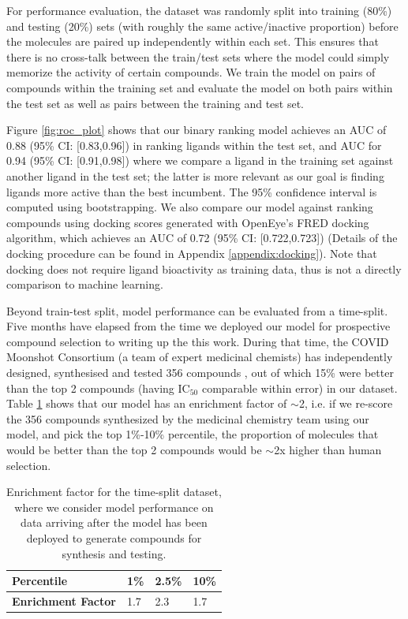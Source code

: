 For performance evaluation, the dataset was randomly split into training (80\%) and testing (20\%) sets (with roughly the same active/inactive proportion) before the molecules are paired up independently within each set. This ensures that there is no cross-talk between the train/test sets where the model could simply memorize the activity of certain compounds. We train the model on pairs of compounds within the training set and evaluate the model on both pairs within the test set as well as pairs between the training and test set.


Figure \ref{fig:roc_plot} shows that our binary ranking model achieves an AUC of 0.88 (95\% CI: [0.83,0.96]) in ranking ligands within the test set, and AUC for 0.94 (95\% CI: [0.91,0.98]) where we compare a ligand in the training set against another ligand in the test set; the latter is more relevant as our goal is finding ligands more active than the best incumbent. The 95\% confidence interval is computed using bootstrapping. We also compare our model against ranking compounds using docking scores generated with OpenEye's FRED docking algorithm, which achieves an AUC of 0.72 (95\% CI: [0.722,0.723]) (Details of the docking procedure can be found in Appendix \ref{appendix:docking}). Note that docking does not require ligand bioactivity as training data, thus is not a directly comparison to machine learning.


Beyond train-test split, model performance can be evaluated from a time-split. Five months have elapsed from the time we deployed our model for prospective compound selection to writing up the this work. During that time, the COVID Moonshot Consortium (a team of expert medicinal chemists) has independently designed, synthesised and tested 356 compounds \cite{moonshot2020covid}, out of which 15\% were better than the top 2 compounds (having $\mathrm{IC}_{50}$ comparable within error) in our dataset. Table \ref{table:time_split} shows that our model has an enrichment factor of $\sim$2, i.e. if we re-score the 356 compounds synthesized by the medicinal chemistry team using our model, and pick the top 1\%-10\% percentile, the proportion of molecules that would be better than the top 2 compounds would be $\sim$2x higher than human selection. 

\begin{table}[!bh]
    \centering
    \begin{tabular}{|l|l|l|l|}
    \hline
    \textbf{Percentile}        & 1\% & 2.5\% & 10\% \\ \hline
    \textbf{Enrichment Factor} & 1.7 & 2.3   & 1.7  \\ \hline
    \end{tabular}
    \caption{Enrichment factor for the time-split dataset, where we consider model performance on data arriving after the model has been deployed to generate compounds for synthesis and testing. }
    \label{table:time_split}
\end{table}

